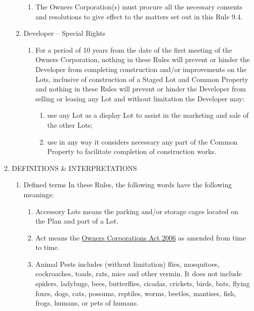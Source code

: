 \documentclass{article}
\begin{document}
\begin{enumerate}[label=\arabic*.]
\begin{enumerate}[label=\arabic{enumi}.\arabic*.]
\begin{enumerate}[label=(\arabic*)]
\item  The Owners Corporation(s) must procure all the necessary consents and resolutions to give effect to the matters set out in this Rule 9.4.


\end{enumerate}

\item  Developer – Special Rights

\begin{enumerate}[label=(\arabic*)]

\item  For a period of 10 years from the date of the first meeting of the Owners Corporation, nothing in these Rules will prevent or hinder the Developer from completing construction and/or improvements on the Lots, inclusive of construction of a Staged Lot and Common Property and nothing in these Rules will prevent or hinder the Developer from selling or leasing any Lot and without limitation the Developer may:

\begin{enumerate}[label=(\alph*)]

\item  use any Lot as a display Lot to assist in the marketing and sale of the other Lots;

\item  use in any way it considers necessary any part of the Common Property to facilitate completion of construction works.

\end{enumerate}

\end{enumerate}

\end{enumerate}

\item  DEFINITIONS \& INTERPRETATIONS

\begin{enumerate}[label=\arabic{enumi}.\arabic*.]

\item  Defined terms In these Rules, the following words have the following meanings:

\begin{enumerate}[label=(\arabic*)]

\item  Accessory Lots means the parking and/or storage cages located on the Plan and part of a Lot.

\item  Act means the \href{https://www.legislation.vic.gov.au/in-force/acts/owners-corporations-act-2006/017}{Owners Corporations Act 2006} as amended from time to time.
\item Animal Pests includes (without limitation) flies, mosquitoes, cockroaches, toads, rats, mice and other vermin. It does not include spiders, ladybugs, bees, butterflies, cicadas, crickets, birds, bats, flying foxes, dogs, cats, possums, reptiles, worms, beetles, mantises, fish, frogs, humans, or pets of humans.


\end{enumerate}
\end{enumerate}
\end{enumerate}
\end{document}
